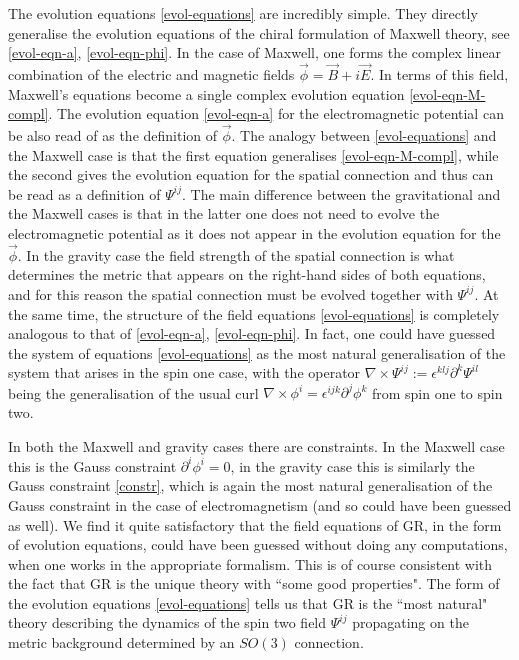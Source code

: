 \documentclass[10pt]{report}
\theoremstyle{definition}
\newcommand{\im}{i}
\begin{document}
The evolution equations \cref{evol-equations} are incredibly simple. They directly generalise the evolution equations of the chiral formulation of Maxwell theory, see \cref{evol-eqn-a}, \cref{evol-eqn-phi}. In the case of Maxwell, one forms the complex linear combination of the electric and magnetic fields $\vec{\phi}=\vec{B}+\im \vec{E}$. In terms of this field, Maxwell's equations become a single complex evolution equation \cref{evol-eqn-M-compl}. The evolution equation \cref{evol-eqn-a} for the electromagnetic potential can be also read of as the definition of $\vec{\phi}$. The analogy between \cref{evol-equations} and the Maxwell case is that the first equation generalises \cref{evol-eqn-M-compl}, while the second gives the evolution equation for the spatial connection and thus can be read as a definition of $\Psi^{ij}$. The main difference between the gravitational and the Maxwell cases is that in the latter one does not need to evolve the electromagnetic potential as it does not appear in the evolution equation for the $\vec{\phi}$. In the gravity case the field strength of the spatial connection is what determines the metric that appears on the right-hand sides of both equations, and for this reason the spatial connection must be evolved together with $\Psi^{ij}$. At the same time, the structure of the field equations \cref{evol-equations} is completely analogous to that of \cref{evol-eqn-a}, \cref{evol-eqn-phi}. In fact, one could have guessed the system of equations \cref{evol-equations} as the most natural generalisation of the system that arises in the spin one case, with the operator $\nabla\times \Psi^{ij}:=\epsilon^{klj} \partial^k \Psi^{il}$ being the generalisation of the usual curl $\nabla\times \phi^i = \epsilon^{ijk} \partial^j \phi^k$ from spin one to spin two.

In both the Maxwell and gravity cases there are constraints. In the Maxwell case this is the Gauss constraint $\partial^i \phi^i=0$, in the gravity case this is similarly the Gauss constraint \cref{constr}, which is again the most natural generalisation of the Gauss constraint in the case of electromagnetism (and so could have been guessed as well). We find it quite satisfactory that the field equations of GR, in the form of evolution equations, could have been guessed without doing any computations, when one works in the appropriate formalism. This is of course consistent with the fact that GR is the unique theory with ``some good properties". The form of the evolution equations \cref{evol-equations} tells us that GR is the ``most natural" theory describing the dynamics of the spin two field $\Psi^{ij}$ propagating on the metric background determined by an $SO(3)$ connection.
\end{document}
